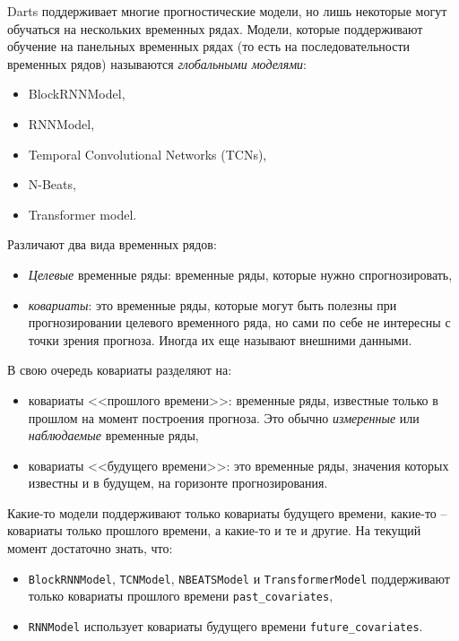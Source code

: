 \documentclass[%
	11pt,
	a4paper,
	utf8,
		]{article}
\begin{document}
Darts поддерживает многие прогностические модели, но лишь некоторые могут обучаться на нескольких временных рядах. Модели, которые поддерживают обучение на панельных временных рядах (то есть на последовательности временных рядов) называются \emph{глобальными моделями}:
\begin{itemize}
	\item BlockRNNModel,
	
	\item RNNModel,
	
	\item Temporal Convolutional Networks (TCNs),
	
	\item N-Beats,
	
	\item Transformer model.
\end{itemize}

Различают два вида временных рядов:
\begin{itemize}
	\item \emph{Целевые} временные ряды: временные ряды, которые нужно спрогнозировать,
	
	\item \emph{ковариаты}: это временные ряды, которые могут быть полезны при прогнозировании целевого временного ряда, но сами по себе не интересны с точки зрения прогноза. Иногда их еще называют внешними данными.
\end{itemize}

В свою очередь ковариаты разделяют на:
\begin{itemize}
	\item ковариаты <<прошлого времени>>: временные ряды, известные только в прошлом на момент построения прогноза. Это обычно \emph{измеренные} или \emph{наблюдаемые} временные ряды,
	
	\item ковариаты <<будущего времени>>: это временные ряды, значения которых известны и в будущем, на горизонте прогнозирования.
\end{itemize}

Какие-то модели поддерживают только ковариаты будущего времени, какие-то -- ковариаты только прошлого времени, а какие-то и те и другие. На текущий момент достаточно знать, что:
\begin{itemize}
	\item \verb|BlockRNNModel|, \verb|TCNModel|, \verb|NBEATSModel| и \verb|TransformerModel| поддерживают только ковариаты прошлого времени \verb|past_covariates|,
	
	\item \verb|RNNModel| использует ковариаты будущего времени \verb|future_covariates|.
\end{itemize}
\end{document}
